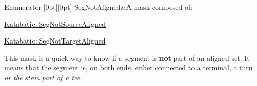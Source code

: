 \begin{DoxyEnumFields}{Enumerator}
[0pt][0pt]{}\mbox{\label{namespaceKatabatic_a94585537ee1724ea9315578ec54380f4a637e0426170a532feac45548e009325d}} 
Seg\+Not\+Aligned&A mask composed of\+:
\begin{DoxyItemize}
\item \mbox{\hyperlink{namespaceKatabatic_a94585537ee1724ea9315578ec54380f4a286b96fc8ab2377a2caf92c82352b0c8}{Katabatic\+::\+Seg\+Not\+Source\+Aligned}}
\item \mbox{\hyperlink{namespaceKatabatic_a94585537ee1724ea9315578ec54380f4ac5042810c9268798def84444d31968ea}{Katabatic\+::\+Seg\+Not\+Target\+Aligned}}
\end{DoxyItemize}

This mask is a quick way to know if a segment is {\bfseries not} part of an aligned set. It means that the segment is, on both ends, either connected to a terminal, a turn {\itshape or the stem part of a tee}. \\
\hline

\end{DoxyEnumFields}
